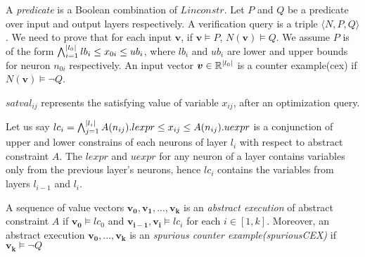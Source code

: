 A {\em predicate} is a Boolean combination of $Linconstr$.
Let $P$ and $Q$ be a predicate over input and output layers respectively.
A verification query is a triple $\langle N, P, Q \rangle$.
We need to prove that for each input $\boldsymbol{v}$,
if $\boldsymbol{v} \models P$, $N(\boldsymbol{v}) \models Q$.
We assume $P$ is of the form
$\bigwedge_{i=1}^{|l_0|}lb_i \leq x_{0i} \leq ub_i$, where $lb_i$ and $ub_i$ are lower and upper bounds for neuron $n_{0i}$ respectively.
An input vector $\boldsymbol{v} \in \mathbb{R}^{|l_0|}$ is a counter example(cex) if $N(\boldsymbol{v}) \models \lnot Q$.  



$satval_{ij}$ represents the satisfying value of variable $x_{ij}$, after an optimization query.






Let us say $lc_i = \bigwedge_{j=1}^{|l_i|} A(n_{ij}).lexpr \leq x_{ij} \leq  A(n_{ij}).uexpr$ is a 
conjunction of upper and lower constrains of each neurons of layer $l_i$ with respect to abstract constraint $A$.
The $lexpr$ and $uexpr$ for any neuron of a layer contains variables only from the previous layer's neurons, 
hence $lc_i$ contains the variables from layers $l_{i-1}$ and $l_i$. 

\begin{df}
  A sequence of value vectors $\boldsymbol{v_0}, \boldsymbol{v_1}, ... , \boldsymbol{v_k}$ is an 
  {\em abstract execution} of abstract constraint $A$ if 
  $\boldsymbol{v_0} \models lc_0$ and $\boldsymbol{v_{i-1}}, \boldsymbol{v_i} \models lc_i$ for each $i \in [1,k]$.  
 Moreover, an abstract execution $\boldsymbol{v_0,...,v_k}$ is
  an {\em spurious counter example(spuriousCEX)} if $\boldsymbol{v_k} \models \lnot Q$
\end{df}

